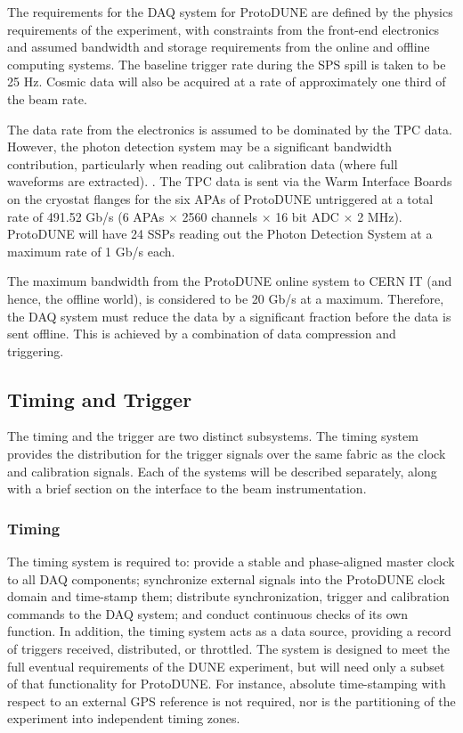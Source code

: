 The requirements for the DAQ system for ProtoDUNE are defined
by the physics requirements of the experiment, with constraints from the
front-end electronics and assumed bandwidth and storage requirements
from the online and offline computing systems.  The baseline trigger
rate during the SPS spill is taken to be 25 Hz.  Cosmic data will also
be acquired at a rate of approximately one third of the beam rate.

The data rate from the electronics is assumed to be dominated by the
TPC data.  However, the photon detection system may be a significant
bandwidth contribution, particularly when reading out calibration data
(where full waveforms are extracted).  .
The TPC data is sent via the Warm Interface Boards on the cryostat flanges
for the six APAs of ProtoDUNE untriggered at a total rate of 491.52 Gb/s
(6 APAs $\times$ 2560 channels $\times$ 16 bit ADC $\times$ 2 MHz).
ProtoDUNE will have 24 SSPs reading out the Photon Detection System at
a maximum rate of 1 Gb/s each.

The maximum bandwidth from the ProtoDUNE online system to CERN IT (and
hence, the offline world), is considered to be 20 Gb/s at a maximum.
Therefore, the DAQ system must reduce the data by a significant fraction
before the data is sent offline.  This is achieved by a combination of
data compression and triggering.


\subsection{Timing and Trigger}
\label{sec:daq_time}

The timing and the trigger are two distinct subsystems.  The timing
system provides the distribution for the trigger signals over the same
fabric as the clock and calibration signals.  Each of the systems will
be described separately, along with a brief section on the interface to
the beam instrumentation.

\subsubsection{Timing}

The timing system is required to: provide a stable and phase-aligned master clock to all DAQ components; synchronize external signals into the ProtoDUNE clock domain and time-stamp them; distribute synchronization, trigger and calibration commands to the DAQ system; and conduct continuous checks of its own function. In addition, the timing system acts as a data source, providing a record of triggers received, distributed, or throttled. The system is designed to meet the full eventual requirements of the DUNE experiment, but will need only a subset of that functionality for ProtoDUNE. For instance, absolute time-stamping with respect to an external GPS reference is not required, nor is the partitioning of the experiment into independent timing zones.

